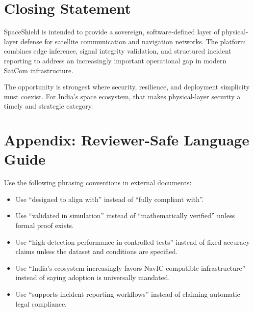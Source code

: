 \documentclass[11pt,a4paper]{article}
\begin{document}
\section{Closing Statement}

SpaceShield is intended to provide a sovereign, software-defined layer of physical-layer defense for satellite communication and navigation networks. The platform combines edge inference, signal integrity validation, and structured incident reporting to address an increasingly important operational gap in modern SatCom infrastructure.

The opportunity is strongest where security, resilience, and deployment simplicity must coexist. For India’s space ecosystem, that makes physical-layer security a timely and strategic category.

\section*{Appendix: Reviewer-Safe Language Guide}

Use the following phrasing conventions in external documents:

\begin{itemize}
    \item Use ``designed to align with'' instead of ``fully compliant with''.
    \item Use ``validated in simulation'' instead of ``mathematically verified'' unless formal proof exists.
    \item Use ``high detection performance in controlled tests'' instead of fixed accuracy claims unless the dataset and conditions are specified.
    \item Use ``India’s ecosystem increasingly favors NavIC-compatible infrastructure'' instead of saying adoption is universally mandated.
    \item Use ``supports incident reporting workflows'' instead of claiming automatic legal compliance.
\end{itemize}
\end{document}
